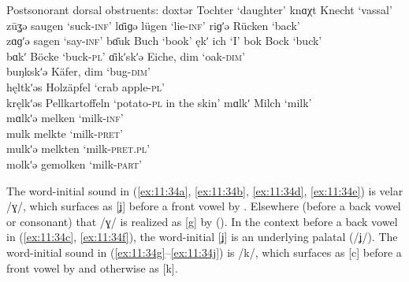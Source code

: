 \ea%
\label{ex:11:35}Postsonorant dorsal obstruents:
\ea\label{ex:11:35a} doxtər \tab [dɔxtər] \tab  Tochter \tab ‘daughter’ 
\ex\label{ex:11:35b} knɑχt \tab [knæçt] \tab  Knecht \tab ‘vassal’ 
\ex\label{ex:11:35c} zūʓə \tab [zuːɣə] \tab  saugen \tab ‘suck-\textsc{inf}’ 
\ex\label{ex:11:35d} lɑ̄iɡə \tab [lɑːiʝə]  \tab  lügen \tab ‘lie-\textsc{inf}’ 
\ex\label{ex:11:35e} riɡʹə \tab [rɪɟə]  \tab   Rücken \tab ‘back’ \\
    zɑɡʹə \tab [zæɟə] \tab  sagen \tab ‘say-\textsc{inf}’ 
\ex\label{ex:11:35f} bɑ̄uk \tab [bɑːuk] \tab  Buch \tab ‘book’ 
\ex\label{ex:11:35g} ękʹ \tab  [ɛc]  \tab  ich \tab ‘I’ 
\ex\label{ex:11:35h} bok \tab [bok] \tab  Bock \tab ‘buck’ \\
    bɑkʹ \tab [bæc] \tab Böcke \tab ‘buck-\textsc{pl}’ 
\ex\label{ex:11:35i} ɑ̄ikʹskʹə \tab [ɑːicscə]  \tab  Eiche, dim \tab ‘oak{}-\textsc{dim}’ \\
    buŋkskʹə \tab [bʊŋkscə]  \tab  Käfer, dim \tab ‘bug{}-\textsc{dim}’ \\
    hęltkʹəs \tab [hɛltcəs] \tab Holzäpfel \tab ‘crab apple-\textsc{pl}’ \\
    kręlkʹəs \tab [krɛlcəs] \tab Pellkartoffeln \tab ‘potato-\textsc{pl} in the skin’ 
\ex\label{ex:11:35j} mɑlkʹ \tab [mælc] \tab Milch \tab ‘milk’ \\
    mɑlkʹə \tab [mælcə] \tab melken \tab ‘milk{}-\textsc{inf}’ \\
    mulk \tab  [mʊlk] \tab  melkte \tab ‘milk{}-\textsc{pret}’ \\
    mulkʹə \tab [mʊlcə] \tab  melkten \tab ‘milk{}-\textsc{pret}.\textsc{pl}’ \\
    molkʹə \tab [mɔlcə] \tab  gemolken \tab ‘milk{}-\textsc{part}’ 
\z 
\z 

The word-initial sound in (\ref{ex:11:34a}, \ref{ex:11:34b}, \ref{ex:11:34d}, \ref{ex:11:34e}) is velar /ɣ/, which surfaces as [ʝ] before a front vowel by . Elsewhere (before a back vowel or consonant) that /ɣ/ is realized as [g] by  (). In the context before a back vowel in (\ref{ex:11:34c}, \ref{ex:11:34f}), the word-initial [ʝ] is an underlying palatal (/ʝ/). The word-initial sound in (\ref{ex:11:34g}--\ref{ex:11:34j}) is /k/, which surfaces as [c] before a front vowel by  and otherwise as [k].


